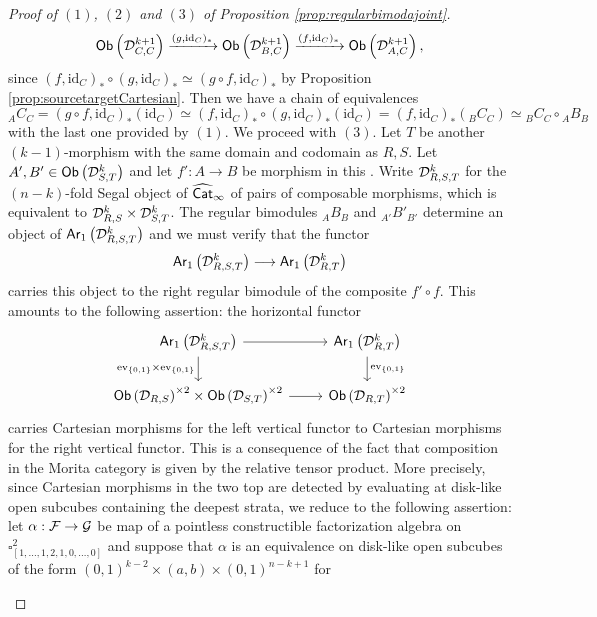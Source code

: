 \documentclass[10pt, reqno, twoside
, final
]{amsart}
\numberwithin{equation}{subsection}%
\theoremstyle{definition}
\theoremstyle{definition}
\theoremstyle{definition}
\theoremstyle{definition}
\theoremstyle{definition}
\theoremstyle{definition}
\theoremstyle{definition}
\theoremstyle{definition}
\theoremstyle{definition}
\theoremstyle{plain}
\theoremstyle{definition}
\theoremstyle{plain}
\theoremstyle{definition}
\theoremstyle{plain}
\theoremstyle{definition}
\theoremstyle{definition}
\theoremstyle{plain}
\theoremstyle{plain}
\theoremstyle{definition}
\theoremstyle{plain}
\theoremstyle{plain}
\theoremstyle{plain}
\begin{document}
\begin{proof}[Proof of $(1)$, $(2)$ and $(3)$ of Proposition \ref{prop:regularbimodajoint}]
\[  \mathsf{Ob}\left(\mathcal{D}^{k+1}_{C,C}\right) \xrightarrow{(g,\mathrm{id}_C)_*} \mathsf{Ob}\left(\mathcal{D}^{k+1}_{B,C}\right)\xrightarrow{(f,\mathrm{id}_C)_*}  \mathsf{Ob}\left(\mathcal{D}^{k+1}_{A,C}\right),   \]
since $(f,\mathrm{id}_C)_*\circ (g,\mathrm{id}_C)_*\simeq (g\circ f,\mathrm{id}_C)_*$ by Proposition \ref{prop:sourcetargetCartesian}. Then we have a chain of equivalences
\[ {}_AC_C=(g\circ f,\mathrm{id}_C)_*(\mathrm{id}_C)\simeq (f,\mathrm{id}_C)_*\circ (g,\mathrm{id}_C)_*(\mathrm{id}_C)= (f,\mathrm{id}_C)_*({}_BC_C) \simeq  {}_BC_C \circ {}_AB_B \]
with the last one provided by $(1)$. We proceed with $(3)$. Let $T$ be another $(k-1)$-morphism with the same domain and codomain as $R,S$. Let $A',B'\in\mathsf{Ob}\left(\mathcal{D}^{k}_{S,T}\right)$ and let $f':A\rightarrow B$ be morphism in this \infcatt. Write $\mathcal{D}^{k}_{R,S,T}$ for the $(n-k)$-fold Segal object of $\widehat{\mathsf{Cat}}_{\infty}$ of pairs of composable morphisms, which is equivalent to $\mathcal{D}_{R,S}^k\times\mathcal{D}_{S,T}^k$. The regular bimodules ${}_AB_B$ and ${}_{A'}B'_{B'}$ determine an object of $\mathsf{Ar}_1\left( \mathcal{D}^{k}_{R,S,T}\right)$ and we must verify that the functor
\[  \mathsf{Ar}_1\left( \mathcal{D}^{k}_{R,S,T}\right)\longrightarrow \mathsf{Ar}_1\left( \mathcal{D}^{k}_{R,T}\right) \]
carries this object to the right regular bimodule of the composite $f'\circ f$. This amounts to the following assertion: the horizontal functor 
\[
\begin{tikzcd}
\mathsf{Ar}_1\left( \icatd^{k}_{R,S,T}\right)\ar[r]\ar[d,"\ev_{\{0,1\}}\times\ev_{\{0,1\}}"'] & \mathsf{Ar}_1\left( \icatd^{k}_{R,T}\right) \ar[d,"\ev_{\{0,1\}}"]\\
\mathsf{Ob}\left(\icatd_{R,S}\right)^{\times 2} \times \mathsf{Ob}\left(\icatd_{S,T}\right)^{\times 2} \ar[r] & \mathsf{Ob}\left(\icatd_{R,T}\right)^{\times 2} 
\end{tikzcd}
\]
carries Cartesian morphisms for the left vertical functor to Cartesian morphisms for the right vertical functor. This is a consequence of the fact that composition in the Morita category is given by the relative tensor product. More precisely, since Cartesian morphisms in the two top \infcats are detected by evaluating at disk-like open subcubes containing the deepest strata, we reduce to the following assertion: let $\alpha:\mathcal{F}\rightarrow \mathcal{G}$ be map of a pointless constructible factorization algebra on $\square^2_{[1,\ldots ,1,2,1,0,\ldots, 0]}$ and suppose that $\alpha$ is an equivalence on disk-like open subcubes of the form $(0,1)^{k-2}\times (a,b)\times (0,1)^{n-k+1}$ for 
\begin{itemize}

\end{itemize}
\end{proof}
\end{document}
